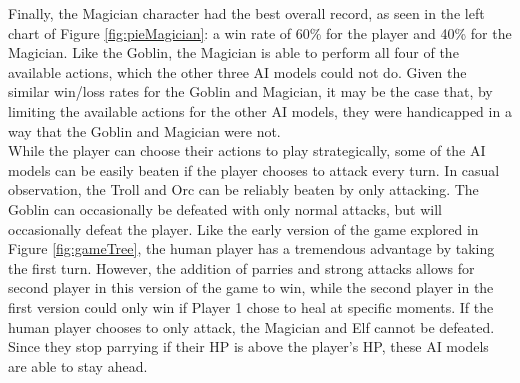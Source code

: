 Finally, the Magician character had the best overall record, as seen in the left chart of Figure \ref{fig:pieMagician}: a win rate of 60\% for the player and 40\% for the Magician. Like the Goblin, the Magician is able to perform all four of the available actions, which the other three AI models could not do. Given the similar win/loss rates for the Goblin and Magician, it may be the case that, by limiting the available actions for the other AI models, they were handicapped in a way that the Goblin and Magician were not.\\



While the player can choose their actions to play strategically, some of the AI models can be easily beaten if the player chooses to attack every turn. In casual observation, the Troll and Orc can be reliably beaten by only attacking. The Goblin can occasionally be defeated with only normal attacks, but will occasionally defeat the player. Like the early version of the game explored in Figure \ref{fig:gameTree}, the human player has a tremendous advantage by taking the first turn. However, the addition of parries and strong attacks allows for second player in this version of the game to win, while the second player in the first version could only win if Player 1 chose to heal at specific moments. If the human player chooses to only attack, the Magician and Elf cannot be defeated. Since they stop parrying if their HP is above the player's HP, these AI models are able to stay ahead.